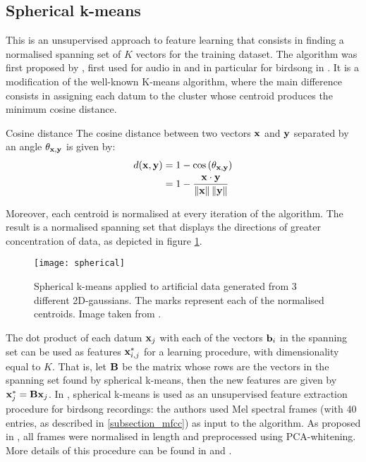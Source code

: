 \documentclass[../main.tex]{subfiles}
\begin{document}
\subsection{Spherical k-means} \label{subsection_spherical}
This is an unsupervised approach to feature learning that consists in finding a normalised spanning set of $K$ vectors for the training dataset. The algorithm was first proposed by \cite{Coates2012}, first used for audio in \cite{Dieleman2013} and in particular for birdsong in \cite{Stowell2014}. It is a modification of the well-known K-means algorithm, where the main difference consists in assigning each datum to the cluster whose centroid produces the minimum cosine distance.
\begin{definition}{Cosine distance} \label{def_cosine_distance}
The cosine distance between two vectors $\mathbf{x}$ and $\mathbf{y}$ separated by an angle $\theta_{\mathbf{x}, \mathbf{y}}$ is given by:
\begin{align*}
d(\mathbf{x}, \mathbf{y}) &= 1 - \cos{(\theta_{\mathbf{x}, \mathbf{y}})}\\
&= 1 - \frac{\mathbf{x} \cdot \mathbf{y}}{\left\lVert\mathbf{x}\right\rVert\left\lVert\mathbf{y}\right\rVert}
\end{align*}
\end{definition}
\par Moreover, each centroid is normalised at every iteration of the algorithm. The result is a normalised spanning set that displays the directions of greater concentration of data, as depicted in figure \ref{fig_spherical}.

\begin{figure}[t]
\centering
\texttt{[image: spherical]}
\caption{Spherical k-means applied to artificial data generated from 3 different 2D-gaussians. The marks represent each of the normalised centroids. Image taken from \cite{Stowell2014}.}
\label{fig_spherical}
\end{figure}
\par The dot product of each datum $\mathbf{x}_j$ with each of the vectors $\mathbf{b}_i$ in the spanning set can be used as features $\mathbf{x}^*_{i,j}$ for a learning procedure, with dimensionality equal to $K$. That is, let $\mathbf{B}$ be the matrix whose rows are the vectors in the spanning set found by spherical k-means, then the new features are given by $\mathbf{x}^*_j = \mathbf{Bx}_j$. In \cite{Stowell2014}, spherical k-means is used as an unsupervised feature extraction procedure for birdsong recordings: the authors used Mel spectral frames (with 40 entries, as described in \ref{subsection_mfcc}) as input to the algorithm. As proposed in \cite{Dieleman2013}, all frames were normalised in length and preprocessed using PCA-whitening. More details of this procedure can be found in \cite{Stowell2014} and \cite{Dieleman2013}.
\end{document}
